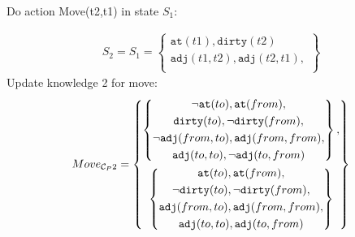 \documentclass[\master/Master.tex]{subfiles}
\begin{document}
Do action Move(t2,t1) in state $S_1$:

\begin{align*}
	S_2 = S_1 = \left\{
	\begin{gathered}
		\texttt{at}(t1),\texttt{dirty}(t2) \\
		\texttt{adj}(t1,t2), \texttt{adj}(t2,t1), \\
	\end{gathered}
	\right\} 
\end{align*}
Update knowledge 2 for move:
\begin{align*}	
	Move_{\mathcal{C}_P2}& =\left\{
	\begin{gathered}
	\left\{
	\begin{gathered}
		\neg \texttt{at}(to), \texttt{at}(from), \\
		\texttt{dirty}(to), \neg \texttt{dirty}(from), \\
		\neg \texttt{adj}(from,to),  \texttt{adj}(from,from), \\
		\texttt{adj}(to,to), \neg  \texttt{adj}(to,from)
	\end{gathered}
	\right\},\\
	\left\{
	\begin{gathered}
		\texttt{at}(to), \texttt{at}(from), \\
		\neg \texttt{dirty}(to), \neg \texttt{dirty}(from), \\
		\texttt{adj}(from,to),  \texttt{adj}(from,from), \\
		\texttt{adj}(to,to), \texttt{adj}(to,from)
	\end{gathered}
	\right\}\\
	\end{gathered}
	\right\} \\
\end{align*}	  
\end{document}
